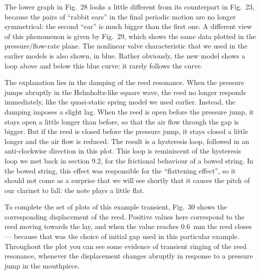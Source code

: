 
  The lower graph in Fig.\ 28 looks a little different from its counterpart in 
  Fig.\ 23, because the pairs of “rabbit ears” in the final periodic motion are 
  no longer symmetrical: the second “ear” is much bigger than the first one. A 
  different view of this phenomenon is given by Fig.\ 29, which shows the same 
  data plotted in the pressure/flow-rate plane. The nonlinear valve 
  characteristic that we used in the earlier models is also shown, in blue. 
  Rather obviously, the new model shows a loop above and below this blue curve: 
  it rarely follows the curve. 


  The explanation lies in the damping of the reed resonance. When the pressure 
  jumps abruptly in the Helmholtz-like square wave, the reed no longer responds 
  immediately, like the quasi-static spring model we used earlier. Instead, the 
  damping imposes a slight lag. When the reed is open before the pressure jump, 
  it stays open a little longer than before, so that the air flow through the 
  gap is bigger. But if the reed is closed before the pressure jump, it stays 
  closed a little longer and the air flow is reduced. The result is a 
  hysteresis loop, followed in an anti-clockwise direction in this plot. This 
  loop is reminiscent of the hysteresis loop we met back in section 9.2, for 
  the frictional behaviour of a bowed string. In the bowed string, this effect 
  was responsible for the ``flattening effect'', so it should not come as a 
  surprise that we will see shortly that it causes the pitch of our clarinet to 
  fall: the note plays a little flat. 

  To complete the set of plots of this example transient, Fig.\ 30 shows the 
  corresponding displacement of the reed. Positive values here correspond to 
  the reed moving towards the lay, and when the value reaches 0.6~mm the reed 
  closes — because that was the choice of initial gap used in this particular 
  example. Throughout the plot you can see some evidence of transient ringing 
  of the reed resonance, whenever the displacement changes abruptly in response 
  to a pressure jump in the mouthpiece. 

